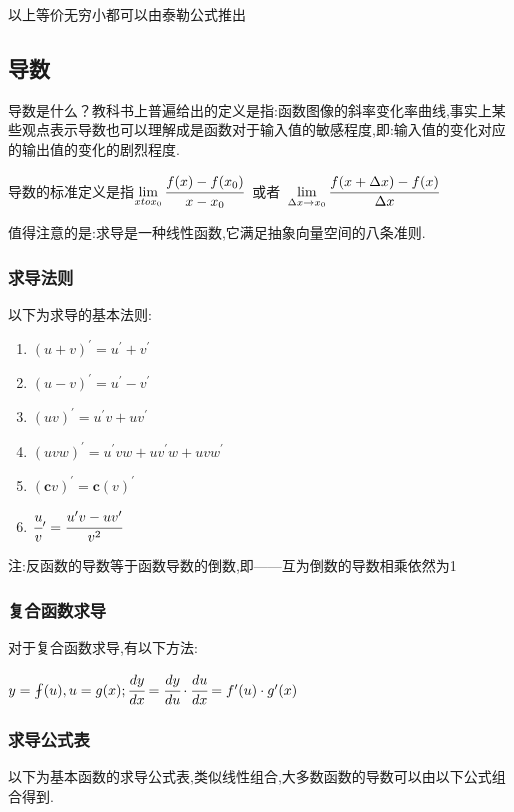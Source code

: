 \documentclass[UTF8,12pt]{ctexbook}
\newcommand{\limNormal}[1]{\lim\limits_{#1}}
\newcommand{\derivative}{^\prime}
\begin{document}
{{{{    以上等价无穷小都可以由泰勒公式推出
  }%

}%

\subsection{导数}{
  导数是什么？教科书上普遍给出的定义是指:函数图像的斜率变化率曲线,事实上某些观点表示导数也可以理解成是函数对于输入值的敏感程度,即:输入值的变化对应的输出值的变化的剧烈程度.

  导数的标准定义是指$\limNormal{x to x_0}\cfrac{f(x) - f(x_0)}{x - x_0}$\ 或者\ $\limNormal{\Delta x \to x_0}\cfrac{f(x + \Delta x) - f(x)}{\Delta x}$

  值得注意的是:求导是一种线性函数,它满足抽象向量空间的八条准则.

  \subsubsection{求导法则}{
    以下为求导的基本法则:
    \begin{enumerate}
      \item $(u + v)\derivative = u\derivative + v\derivative$
      \item $(u - v)\derivative = u\derivative - v\derivative$
      \item $(uv)\derivative = u\derivative v + uv\derivative$
      \item $(uvw)\derivative = u\derivative vw + uv\derivative w + uvw\derivative$
      \item $(\mathbf{c}v)\derivative = \mathbf{c}(v)\derivative$
      \item $\cfrac{u}{v}\derivative = \cfrac{u\derivative v - uv\derivative}{v^2}$
    \end{enumerate}
    注:反函数的导数等于函数导数的倒数,即——互为倒数的导数相乘依然为1
  }%

  \subsubsection{复合函数求导}{
    对于复合函数求导,有以下方法:

    $y = \fint(u), u = g(x); \cfrac{dy}{dx} = \cfrac{dy}{du} \cdot \cfrac{du}{dx} = f\derivative(u) \cdot g\derivative(x)$
  }%

  \subsubsection{求导公式表}{
    以下为基本函数的求导公式表,类似线性组合,大多数函数的导数可以由以下公式组合得到.

}}}}
\end{document}

